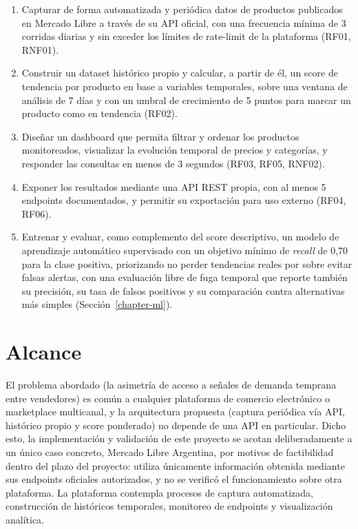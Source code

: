 \begin{enumerate}
	\item Capturar de forma automatizada y periódica datos de productos publicados en Mercado Libre a través de su API oficial, con una frecuencia mínima de 3 corridas diarias y sin exceder los límites de rate-limit de la plataforma (RF01, RNF01).
	\item Construir un dataset histórico propio y calcular, a partir de él, un score de tendencia por producto en base a variables temporales, sobre una ventana de análisis de 7 días y con un umbral de crecimiento de 5 puntos para marcar un producto como en tendencia (RF02).
	\item Diseñar un dashboard que permita filtrar y ordenar los productos monitoreados, visualizar la evolución temporal de precios y categorías, y responder las consultas en menos de 3 segundos (RF03, RF05, RNF02).
	\item Exponer los resultados mediante una API REST propia, con al menos 5 endpoints documentados, y permitir su exportación para uso externo (RF04, RF06).
	\item Entrenar y evaluar, como complemento del score descriptivo, un modelo de aprendizaje automático supervisado con un objetivo mínimo de \emph{recall} de 0,70 para la clase positiva, priorizando no perder tendencias reales por sobre evitar falsas alertas, con una evaluación libre de fuga temporal que reporte también su precisión, su tasa de falsos positivos y su comparación contra alternativas más simples (Sección~\ref{chapter-ml}).
\end{enumerate}

\section{Alcance}\label{sec:alcance}

El problema abordado (la asimetría de acceso a señales de demanda temprana entre vendedores) es común a cualquier plataforma de comercio electrónico o marketplace multicanal, y la arquitectura propuesta (captura periódica vía API, histórico propio y score ponderado) no depende de una API en particular. Dicho esto, la implementación y validación de este proyecto se acotan deliberadamente a un único caso concreto, Mercado Libre Argentina, por motivos de factibilidad dentro del plazo del proyecto: utiliza únicamente información obtenida mediante sus endpoints oficiales autorizados, y no se verificó el funcionamiento sobre otra plataforma. La plataforma contempla procesos de captura automatizada, construcción de históricos temporales, monitoreo de endpoints y visualización analítica.

